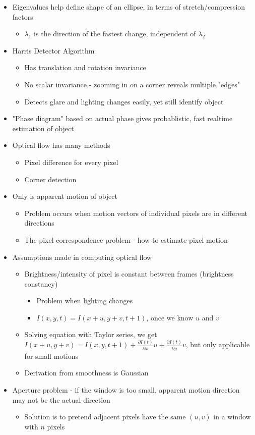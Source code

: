 \documentclass{article}
\begin{document}
\begin{itemize}
\item Eigenvalues help define shape of an ellipse, in terms of stretch/compression factors
\begin{itemize}
\item $\lambda_1$ is the direction of the fastest change, independent of $\lambda_2$ 
\end{itemize}
\item Harris Detector Algorithm
\begin{itemize}
\item Has translation and rotation invariance
\item No scalar invariance - zooming in on a corner reveals multiple "edges"
\item Detects glare and lighting changes easily, yet still identify object
\end{itemize}
\item "Phase diagram" based on actual phase gives probablistic, fast realtime estimation of object
\item Optical flow has many methods
\begin{itemize}
\item Pixel difference for every pixel
\item Corner detection
\end{itemize}
\item Only is apparent motion of object
\begin{itemize}
\item Problem occurs when motion vectors of individual pixels are in different directions
\item The pixel correspondence problem - how to estimate pixel motion
\end{itemize}
\item Assumptions made in computing optical flow
\begin{itemize}
\item Brightness/intensity of pixel is constant between frames (brightness constancy)
\begin{itemize}
\item Problem when lighting changes
\item $I(x,y,t)=I(x+u,y+v,t+1)$, once we know $u$ and $v$ 
\end{itemize}
\item Solving equation with Taylor series,  we get $I(x+u,y+v)=I(x,y,t+1)+\frac{\partial I(t)}{\partial x}u+\frac{\partial I(t)}{\partial y}v$, but only applicable for small motions
\item Derivation from smoothness is Gaussian
\end{itemize}
\item Aperture problem - if the window is too small, apparent motion direction may not be the actual direction
\begin{itemize}
\item Solution is to pretend adjacent pixels have the same $(u,v)$ in a window with $n$ pixels


\end{itemize}
\end{itemize}
\end{document}
